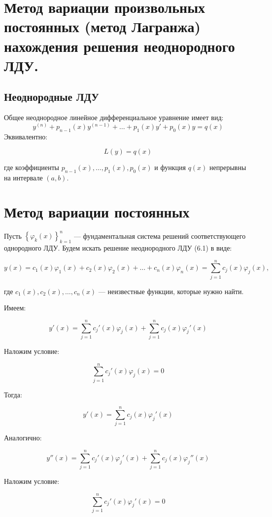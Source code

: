 {
	\section{Метод вариации произвольных постоянных (метод Лагранжа) нахождения решения неоднородного ЛДУ.}

	\subsection*{Неоднородные ЛДУ}

	Общее неоднородное линейное дифференциальное уравнение имеет вид:
	\begin{equation}
	y^{(n)} + p_{n-1}(x)y^{(n-1)} + \ldots + p_1(x)y' + p_0(x)y = q(x) \tag{6.1}
	\end{equation}
	Эквивалентно:


	\[
	L(y) = q(x)
	\]


	где коэффициенты \( p_{n-1}(x), \ldots, p_1(x), p_0(x) \) и функция \( q(x) \) непрерывны на интервале \( (a, b) \).

	\section*{Метод вариации постоянных}

	Пусть \( \left\{ \varphi_k(x) \right\}_{k=1}^{n} \) — фундаментальная система решений соответствующего однородного ЛДУ. Будем искать решение неоднородного ЛДУ (6.1) в виде:


	\[
	y(x) = c_1(x)\varphi_1(x) + c_2(x)\varphi_2(x) + \ldots + c_n(x)\varphi_n(x) = \sum_{j=1}^{n} c_j(x)\varphi_j(x),
	\]


	где \( c_1(x), c_2(x), \ldots, c_n(x) \) — неизвестные функции, которые нужно найти.


Имеем:


\[
y'(x) = \sum_{j=1}^{n} c_j'(x) \varphi_j(x) + \sum_{j=1}^{n} c_j(x) \varphi_j'(x)
\]


Наложим условие:


\[
\sum_{j=1}^{n} c_j'(x) \varphi_j(x) = 0
\]


Тогда:


\[
y'(x) = \sum_{j=1}^{n} c_j(x) \varphi_j'(x)
\]



Аналогично:


\[
y''(x) = \sum_{j=1}^{n} c_j'(x) \varphi_j'(x) + \sum_{j=1}^{n} c_j(x) \varphi_j''(x)
\]


Наложим условие:


\[
\sum_{j=1}^{n} c_j'(x) \varphi_j'(x) = 0
\]


}
